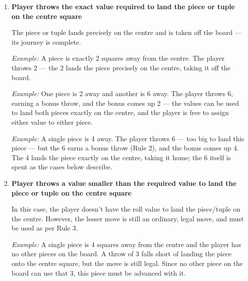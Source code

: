\documentclass[10pt,a4paper]{article}
\begin{document}
\begin{enumerate}[leftmargin=2em]
  \item \textbf{Player throws the exact value required to land the piece or tuple on the centre square}

    The piece or tuple lands precisely on the centre and is taken off the
    board --- its journey is complete.

    \emph{Example:} A piece is exactly 2 squares away from the centre. The
    player throws 2 --- the 2 lands the piece precisely on the centre,
    taking it off the board.

    \begin{center}
      
    \end{center}

    \emph{Example:} One piece is 2 away and another is 6 away. The player
    throws 6, earning a bonus throw, and the bonus comes up 2 --- the
    values can be used to land both pieces exactly on the centre, and the
    player is free to assign either value to either piece.

    \begin{center}
      
    \end{center}

    \emph{Example:} A single piece is 4 away. The player throws 6 --- too
    big to land this piece --- but the 6 earns a bonus throw (Rule 2), and
    the bonus comes up 4. The 4 lands the piece exactly on the centre,
    taking it home; the 6 itself is spent as the cases below describe.

    \begin{center}
      
    \end{center}

  \item \textbf{Player throws a value smaller than the required value to land the piece or tuple on the centre square}
  
    In this case, the player doesn't have the roll value to land the piece/tuple on the centre.
    However, the lesser move is still an ordinary, legal move, and must be used as per Rule 3. 

    \emph{Example:} A single piece is 4 squares away from the centre and the player has no other pieces on the board. 
    A throw of 3 falls short of landing the piece onto the centre square, but the move is still legal. 
    Since no other piece on the board can use that 3, this piece must be advanced with it.
    \begin{center}
      
    \end{center}


\end{enumerate}
\end{document}
